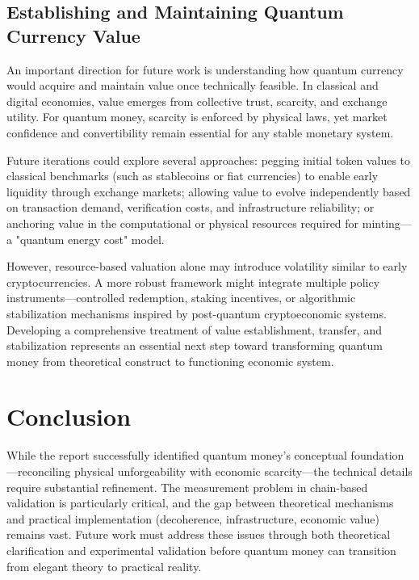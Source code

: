 \documentclass[a4paper,10.5pt,twoside]{article}
\begin{document}
\subsection{Establishing and Maintaining Quantum Currency Value}

An important direction for future work is understanding how quantum currency would acquire and maintain value once technically feasible. In classical and digital economies, value emerges from collective trust, scarcity, and exchange utility. For quantum money, scarcity is enforced by physical laws,\autocite{Wiesner_1983} yet market confidence and convertibility remain essential for any stable monetary system.

Future iterations could explore several approaches: pegging initial token values to classical benchmarks (such as stablecoins or fiat currencies) to enable early liquidity through exchange markets;\autocite{Nakamoto_2008} allowing value to evolve independently based on transaction demand, verification costs, and infrastructure reliability;\autocite{Zhandry_2019} or anchoring value in the computational or physical resources required for minting—a "quantum energy cost" model.\autocite{Gheorghiu_2022}

However, resource-based valuation alone may introduce volatility similar to early cryptocurrencies. A more robust framework might integrate multiple policy instruments—controlled redemption, staking incentives, or algorithmic stabilization mechanisms inspired by post-quantum cryptoeconomic systems.\autocite{Alagic_2023} Developing a comprehensive treatment of value establishment, transfer, and stabilization represents an essential next step toward transforming quantum money from theoretical construct to functioning economic system.

\section{Conclusion}

While the report successfully identified quantum money's conceptual foundation—reconciling physical unforgeability with economic scarcity—the technical details require substantial refinement. The measurement problem in chain-based validation is particularly critical, and the gap between theoretical mechanisms and practical implementation (decoherence, infrastructure, economic value) remains vast. Future work must address these issues through both theoretical clarification and experimental validation before quantum money can transition from elegant theory to practical reality.

\printbibliography
\end{document}
